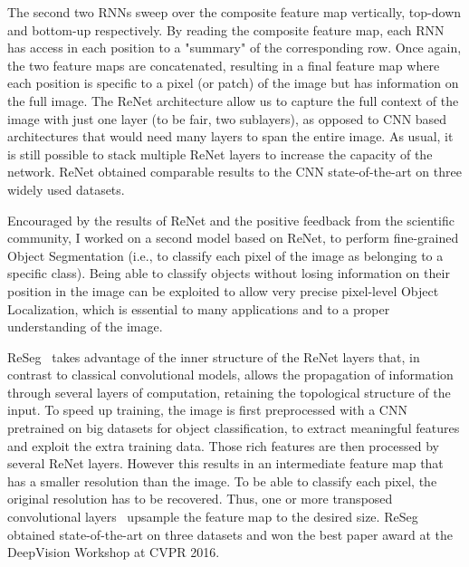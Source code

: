 The second two RNNs sweep over the composite feature map vertically, top-down
and bottom-up respectively. By reading the composite feature map, each RNN has
access in each position to a "summary" of the corresponding row. Once again,
the two feature maps are concatenated, resulting in a final feature map where
each position is specific to a pixel (or patch) of the image but has
information on the full image. The ReNet architecture allow us to capture the
full context of the image with just one layer (to be fair, two sublayers), as
opposed to CNN based architectures that would need many layers to span the
entire image. As usual, it is still possible to stack multiple ReNet layers to
increase the capacity of the network. ReNet obtained comparable results to the
CNN state-of-the-art on three widely used datasets.

Encouraged by the results of ReNet and the positive feedback from the
scientific community, I worked on a second model based on ReNet, to perform
fine-grained Object Segmentation (i.e., to classify each pixel of the image as
belonging to a specific class). Being able to classify objects without losing
information on their position in the image can be exploited to allow very
precise pixel-level Object Localization, which is essential to many
applications and to a proper understanding of the image.

ReSeg~\citep{Visin_2016_CVPR_Workshops} takes advantage of the inner structure
of the ReNet layers that, in contrast to classical convolutional models, allows
the propagation of information through several layers of computation, retaining
the topological structure of the input. To speed up training, the image is
first preprocessed with a CNN pretrained on big datasets for object
classification, to extract meaningful features and exploit the extra training
data. Those rich features are then processed by several ReNet layers. However
this results in an intermediate feature map that has a smaller resolution
than the image. To be able to classify each pixel, the original resolution has
to be recovered. Thus, one or more transposed convolutional layers~\citep{
dumoulin2016guide} upsample the feature map to the desired size. ReSeg obtained
state-of-the-art on three datasets and won the best paper award at the
DeepVision Workshop at CVPR 2016.

